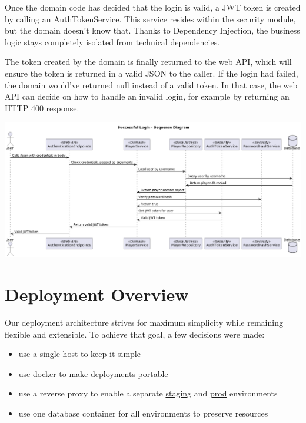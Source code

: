 Once the domain code has decided that the login is valid, a JWT token is created by calling an AuthTokenService.
This service resides within the security module, but the domain doesn't know that.
Thanks to Dependency Injection, the business logic stays completely isolated from technical dependencies.

The token created by the domain is finally returned to the web API, which will ensure the token is returned in a valid JSON to the caller.
If the login had failed, the domain would've returned null instead of a valid token.
In that case, the web API can decide on how to handle an invalid login, for example by returning an HTTP 400 response.

\includegraphics[width=\textwidth]{resources/diagrams/login-sequence}

\newpage

\section{Deployment Overview}
\label{sec:architecture_deployment}
Our deployment architecture strives for maximum simplicity while remaining flexible and extensible.
To achieve that goal, a few decisions were made:
\begin{itemize}
    \item use a single host to keep it simple
    \item use docker to make deployments portable
    \item use a reverse proxy to enable a separate \href{https://jasstracker-test.honegger.dev}{staging} and \href{https://jasstracker.honegger.dev}{prod} environments
    \item use one database container for all environments to preserve resources
\end{itemize}

